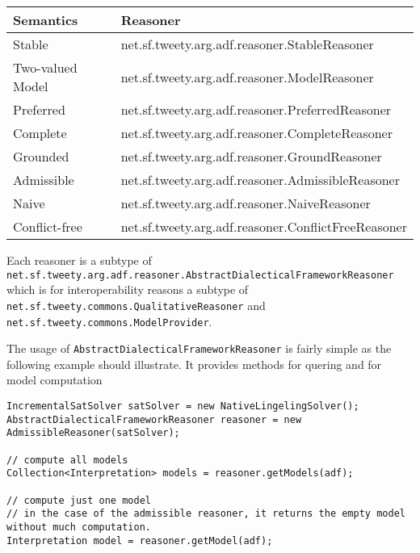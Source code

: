\documentclass{scrartcl}[a4paper,10pt]
\newcommand{\jlstinline}[1]{\lstinline[style=java]|#1|}
\begin{document}
\begin{table}[h!]
	\begin{tabular}{|l|l|}
		\hline
		\textbf{Semantics} & \textbf{Reasoner}                                   \\ \hline
		Stable             & net.sf.tweety.arg.adf.reasoner.StableReasoner       \\ \hline
		Two-valued Model   & net.sf.tweety.arg.adf.reasoner.ModelReasoner        \\ \hline
		Preferred          & net.sf.tweety.arg.adf.reasoner.PreferredReasoner    \\ \hline
		Complete           & net.sf.tweety.arg.adf.reasoner.CompleteReasoner     \\ \hline
		Grounded           & net.sf.tweety.arg.adf.reasoner.GroundReasoner       \\ \hline
		Admissible         & net.sf.tweety.arg.adf.reasoner.AdmissibleReasoner   \\ \hline
		Naive              & net.sf.tweety.arg.adf.reasoner.NaiveReasoner        \\ \hline
		Conflict-free      & net.sf.tweety.arg.adf.reasoner.ConflictFreeReasoner \\ \hline
	\end{tabular}
\end{table}

Each reasoner is a subtype of \jlstinline{net.sf.tweety.arg.adf.reasoner.AbstractDialecticalFrameworkReasoner} which is for interoperability reasons a subtype of \jlstinline{net.sf.tweety.commons.QualitativeReasoner} and \jlstinline{net.sf.tweety.commons.ModelProvider}.

The usage of \jlstinline{AbstractDialecticalFrameworkReasoner} is fairly simple as the following example should illustrate. It provides methods for quering and for model computation

\begin{lstlisting}[style=java,caption=Computing the models of an adf]
IncrementalSatSolver satSolver = new NativeLingelingSolver();
AbstractDialecticalFrameworkReasoner reasoner = new AdmissibleReasoner(satSolver);

// compute all models
Collection<Interpretation> models = reasoner.getModels(adf);

// compute just one model
// in the case of the admissible reasoner, it returns the empty model without much computation.
Interpretation model = reasoner.getModel(adf);
\end{lstlisting}
\end{document}
